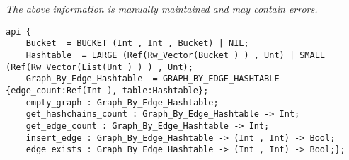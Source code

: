 \label{api:Graph\_By\_Edge\_Hashtable}

{\tiny \it The above information is manually maintained and may contain errors.}
\begin{verbatim}
api {
    Bucket  = BUCKET (Int , Int , Bucket) | NIL;
    Hashtable  = LARGE (Ref(Rw_Vector(Bucket ) ) , Unt) | SMALL (Ref(Rw_Vector(List(Unt ) ) ) , Unt);
    Graph_By_Edge_Hashtable  = GRAPH_BY_EDGE_HASHTABLE {edge_count:Ref(Int ), table:Hashtable};
    empty_graph : Graph_By_Edge_Hashtable;
    get_hashchains_count : Graph_By_Edge_Hashtable -> Int;
    get_edge_count : Graph_By_Edge_Hashtable -> Int;
    insert_edge : Graph_By_Edge_Hashtable -> (Int , Int) -> Bool;
    edge_exists : Graph_By_Edge_Hashtable -> (Int , Int) -> Bool;};
\end{verbatim}
